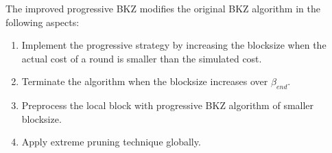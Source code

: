 \documentclass[11pt]{article}
\begin{document}
The improved progressive BKZ modifies the original BKZ algorithm in the following aspects:
\begin{enumerate}
	\item Implement the progressive strategy by increasing the blocksize when the actual cost of a round is smaller than the simulated cost.
	\item Terminate the algorithm when the blocksize increases over $\beta_{end}$.
	\item Preprocess the local block with progressive BKZ algorithm of smaller blocksize.
	\item Apply extreme pruning technique globally.
\end{enumerate}



\end{document}
